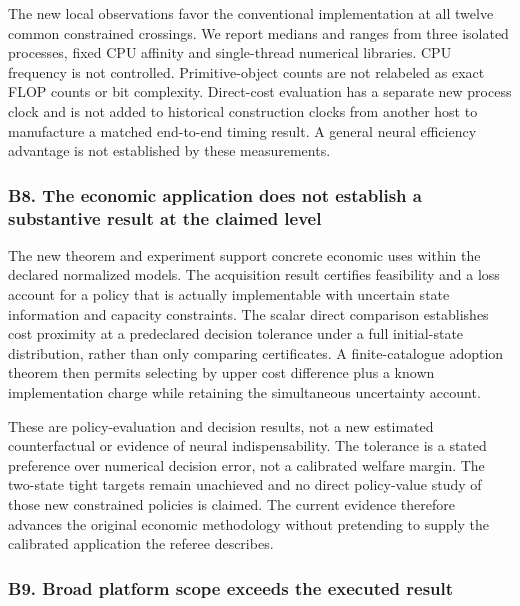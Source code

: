 \documentclass[ecta,nameyear,draft]{econsocart}
\begin{document}
The new local observations favor the conventional implementation at all
twelve common constrained crossings. We report medians and ranges from
three isolated processes, fixed CPU affinity and single-thread numerical
libraries. CPU frequency is not controlled. Primitive-object counts are
not relabeled as exact FLOP counts or bit complexity. Direct-cost
evaluation has a separate new process clock and is not added to
historical construction clocks from another host to manufacture a
matched end-to-end timing result. A general neural efficiency advantage
is not established by these measurements.

\hypertarget{b8-the-economic-application-does-not-establish-a-substantive-result-at-the-claimed-level}{%
\subsubsection{B8. The economic application does not establish a
substantive result at the claimed
level}\label{b8-the-economic-application-does-not-establish-a-substantive-result-at-the-claimed-level}}

The new theorem and experiment support concrete economic uses within the
declared normalized models. The acquisition result certifies feasibility
and a loss account for a policy that is actually implementable with
uncertain state information and capacity constraints. The scalar direct
comparison establishes cost proximity at a predeclared decision
tolerance under a full initial-state distribution, rather than only
comparing certificates. A finite-catalogue adoption theorem then permits
selecting by upper cost difference plus a known implementation charge
while retaining the simultaneous uncertainty account.

These are policy-evaluation and decision results, not a new estimated
counterfactual or evidence of neural indispensability. The tolerance is
a stated preference over numerical decision error, not a calibrated
welfare margin. The two-state tight targets remain unachieved and no
direct policy-value study of those new constrained policies is claimed.
The current evidence therefore advances the original economic
methodology without pretending to supply the calibrated application the
referee describes.

\hypertarget{b9-broad-platform-scope-exceeds-the-executed-result}{%
\subsubsection{B9. Broad platform scope exceeds the executed
result}\label{b9-broad-platform-scope-exceeds-the-executed-result}}
\end{document}
